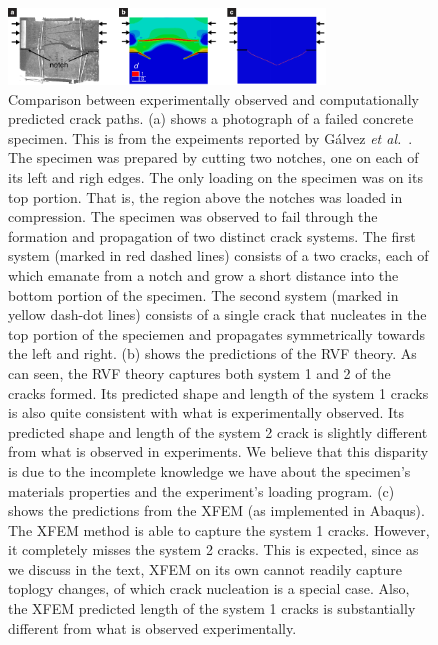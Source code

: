 \documentclass[12pt,onecolumn]{article}
\begin{document}
\begin{figure}[ht!]
    \centering
    \includegraphics[width=0.75\textwidth]{./Figures/XFEM/concrete_ver2.pdf}
    \caption{Comparison between experimentally observed and computationally predicted crack paths.
(a) shows a photograph of a failed concrete specimen. This is from the expeiments reported by G{\'a}lvez \textit{et al.}~\cite{galvez1999fracture}.   The specimen was prepared by  cutting two notches, one  on each of its   left and righ edges.  The only loading on the specimen was on its  top portion. That is,   the region above the notches was loaded in compression. The specimen was observed to fail through the formation and  propagation of two distinct crack systems.  The first system   (marked in red dashed lines)  consists  of a two cracks, each of which  emanate  from a  notch and  grow a short distance into the  bottom portion of the specimen. The second system (marked in yellow dash-dot lines) consists  of a single crack that nucleates in the top portion of the speciemen and propagates symmetrically towards the left and right.  (b) shows the predictions of the RVF theory.  As can  seen, the    RVF theory captures both system 1 and 2 of the cracks formed. Its predicted shape and length of the  system 1 cracks is also quite consistent with what is experimentally observed.  Its  predicted shape and length of the system 2 crack is  slightly different from what is observed in experiments. We believe that this disparity is due to the incomplete knowledge we have about the specimen's materials properties and the experiment's loading program. (c) shows the predictions from the XFEM (as implemented in Abaqus). The XFEM method is able to capture the system 1 cracks. However, it completely misses the  system 2 cracks. This is expected, since as we discuss in the text, XFEM on its own cannot readily capture  toplogy changes, of which crack nucleation is a special case. Also, the XFEM predicted length of the  system 1 cracks is substantially  different from what is observed experimentally. }
    \label{Fig:Concrete}
\end{figure}















\newpage


\end{document}
